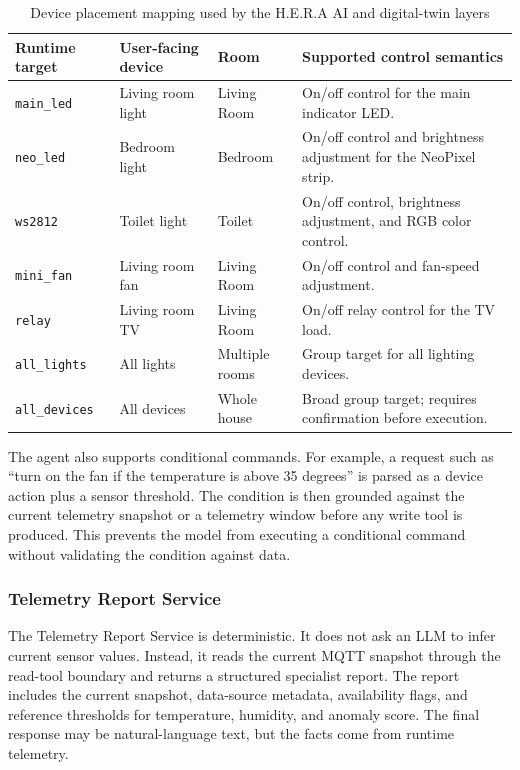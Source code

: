 \begin{table}[H]
    \centering
    \caption{Device placement mapping used by the H.E.R.A AI and digital-twin layers}
    \label{tab:hera-device-placement-map}
    \renewcommand{\arraystretch}{1.16}
    \small
    \begin{tabularx}{\textwidth}{@{}p{2.6cm}p{2.8cm}p{2.5cm}X@{}}
        \toprule
        \textbf{Runtime target} & \textbf{User-facing device} & \textbf{Room} & \textbf{Supported control semantics} \\
        \midrule
        \texttt{main\_led} & Living room light & Living Room & On/off control for the main indicator LED. \\
        \texttt{neo\_led} & Bedroom light & Bedroom & On/off control and brightness adjustment for the NeoPixel strip. \\
        \texttt{ws2812} & Toilet light & Toilet & On/off control, brightness adjustment, and RGB color control. \\
        \texttt{mini\_fan} & Living room fan & Living Room & On/off control and fan-speed adjustment. \\
        \texttt{relay} & Living room TV & Living Room & On/off relay control for the TV load. \\
        \texttt{all\_lights} & All lights & Multiple rooms & Group target for all lighting devices. \\
        \texttt{all\_devices} & All devices & Whole house & Broad group target; requires confirmation before execution. \\
        \bottomrule
    \end{tabularx}
\end{table}

The agent also supports conditional commands. For example, a request such as ``turn on the fan if the temperature is above 35 degrees'' is parsed as a device action plus a sensor threshold. The condition is then grounded against the current telemetry snapshot or a telemetry window before any write tool is produced. This prevents the model from executing a conditional command without validating the condition against data.

\subsubsection{Telemetry Report Service}

The Telemetry Report Service is deterministic. It does not ask an LLM to infer current sensor values. Instead, it reads the current MQTT snapshot through the read-tool boundary and returns a structured specialist report. The report includes the current snapshot, data-source metadata, availability flags, and reference thresholds for temperature, humidity, and anomaly score. The final response may be natural-language text, but the facts come from runtime telemetry.

